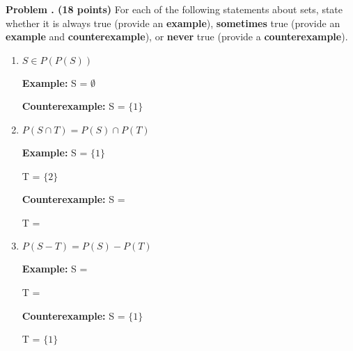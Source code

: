 \newpage
\addtocounter{problemctr}{1}

{\bf
Problem \theproblemctr.  (18 \xspace points)}
For each of the following statements about sets, state whether it is always true (provide an {\bf example}), {\bf sometimes} true (provide an {\bf example} and {\bf counterexample}), or {\bf never} true (provide a {\bf counterexample}).

\vspace{.2in}

\begin{enumerate}[label=(\arabic*),itemsep=1.5in]
\item
$S \in P(P(S))$

{\bf Example:}          S = \underline{$\emptyset$}

{\bf Counterexample:}   S = \underline{$\{1\}$}

\item
$P(S\cap T) = P(S)\cap P(T)$

{\bf Example:}          S = \underline{$\{1\}$}

                        \hspace{100pt}T = \underline{$\{2\}$}

{\bf Counterexample:}   S = \underline{}

                        \hspace{100pt}T = \underline{}

\item
$P(S-T)=P(S)-P(T)$

{\bf Example:}          S = \underline{}

                        \hspace{100pt}T = \underline{}

{\bf Counterexample:}   S = \underline{$\{1\}$}

                        \hspace{100pt}T = \underline{$\{1\}$}
\end{enumerate}


